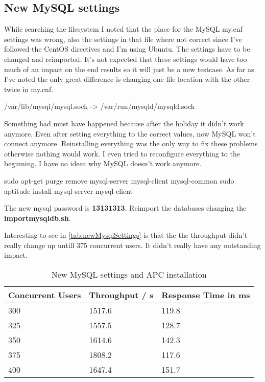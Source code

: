 \clearpage{}
\subsection{New MySQL settings}
While searching the filesystem I noted that the place for the MySQL my.cnf settings was wrong, also the settings in that file where not correct since I've followed the CentOS directives and I'm using Ubuntu. The settings have to be changed and reimported. It's not expected that these settings would have too much of an impact on the end results so it will just be a new testcase.
As far as I've noted the only great difference is changing one file location with the other twice in my.cnf.
\begin{codelisting}
/var/lib/mysql/mysql.sock -> /var/run/mysqld/mysqld.sock
\end{codelisting}

Something bad must have happened because after the holiday it didn't work anymore.
Even after setting everything to the correct values, now MySQL won't connect anymore. Reinstalling everything was the only way to fix these problems otherwise nothing would work. 
I even tried to reconfigure everything to the beginning. I have no ideea why MySQL doesn't work anymore.
\begin{codelisting}
sudo apt-get purge remove mysql-server mysql-client mysql-common
sudo aptitude install mysql-server mysql-client
\end{codelisting}
The new \gls{mysql} password is \textbf{13131313}. Reimport the databases changing the \textbf{importmysqldb.sh}.

Interesting to see in \autoref{tab:newMysqlSettings} is that the the throughput didn't really change up untill 375 concurrent users. It didn't really have any outstanding impact.
\begin{table}[htb!]\begin{center}
\caption{New MySQL settings and APC installation}\label{tab:newMysqlSettings}
\begin{tabular}{|p{2.2cm}|p{2.2cm}|p{2.2cm}|}\hline\rowcolor{myLightGreen}
 {\bf\color{white} Concurrent Users} & {\bf\color{white} Throughput / s} & {\bf\color{white} Response Time in ms} \\ \hline 
 300 & 1517.6 & 119.8 \\ \hline 
 325 & 1557.5 & 128.7 \\ \hline 
 350 & 1614.6 & 142.3 \\ \hline \rowcolor{rowhighlight}
 375 & 1808.2 & 117.6 \\ \hline 
 400 & 1647.4 & 151.7 \\ \hline 
\end{tabular}\end{center}
\end{table}

